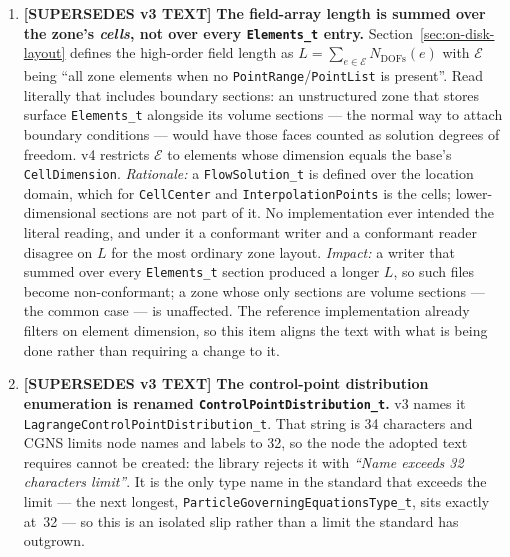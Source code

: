 \documentclass[11pt,letterpaper]{article}
\newif\ifvfourdraft
\newenvironment{v4block}{\ifvfourdraft\color{v4violet}\fi\ignorespaces}{\par}
\newcommand{\SUPERSEDESIV}{\ifvfourdraft
  \textcolor{v4violet}{\textbf{[SUPERSEDES v3 TEXT]}}\else
  \textcolor{clarifybrown}{\textbf{[SUPERSEDES v3 TEXT]}}\fi}
\begin{document}
{\begin{v4block}
\begin{enumerate}[leftmargin=1.4em,itemsep=0.5em]

  \item \SUPERSEDESIV{} \textbf{The field-array length is summed over the zone's
    \emph{cells}, not over every \texttt{Elements\_t} entry.}
    Section~\ref{sec:on-disk-layout} defines the high-order field length as
    $L=\sum_{e\in\mathcal{E}} N_\mathrm{DOFs}(e)$ with $\mathcal{E}$ being ``all
    zone elements when no \texttt{PointRange}/\texttt{PointList} is present''.
    Read literally that includes boundary sections: an unstructured zone that
    stores surface \texttt{Elements\_t} alongside its volume sections --- the
    normal way to attach boundary conditions --- would have those faces counted
    as solution degrees of freedom.  v4 restricts $\mathcal{E}$ to elements whose
    dimension equals the base's \texttt{CellDimension}.
    \textit{Rationale:} a \texttt{FlowSolution\_t} is defined over the location
    domain, which for \texttt{CellCenter} and \texttt{InterpolationPoints} is the
    cells; lower-dimensional sections are not part of it.  No implementation ever
    intended the literal reading, and under it a conformant writer and a
    conformant reader disagree on $L$ for the most ordinary zone layout.
    \textit{Impact:} a writer that summed over every \texttt{Elements\_t} section
    produced a longer $L$, so such files become non-conformant; a zone whose only
    sections are volume sections --- the common case --- is unaffected.  The
    reference implementation already filters on element dimension, so this item
    aligns the text with what is being done rather than requiring a change to it.

  \item \SUPERSEDESIV{} \textbf{The control-point distribution enumeration is
    renamed \texttt{ControlPointDistribution\_t}.}  v3 names it
    \texttt{LagrangeControlPointDistribution\_t}.  That string is 34 characters
    and CGNS limits node names and labels to 32, so the node the adopted text
    requires cannot be created: the library rejects it with \emph{``Name exceeds
    32 characters limit''}.  It is the only type name in the standard that
    exceeds the limit --- the next longest,
    \texttt{ParticleGoverningEquationsType\_t}, sits exactly at~32 --- so this is
    an isolated slip rather than a limit the standard has outgrown.


\end{enumerate}
\end{v4block}}
\end{document}
